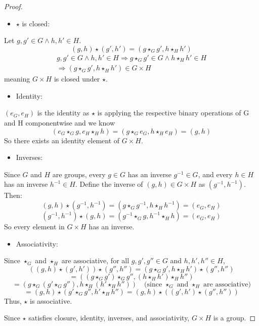 \documentclass[12pt]{article}
\begin{document}
\begin{proof}

    \noindent
    \begin{itemize}
        \item \(\star\) is closed: 
    \end{itemize}

    \noindent
    Let \(g, g' \in G \land h, h' \in H\). 
    \[ 
        (g, h) \star (g', h') = (g\star_G g', h \star_H h')
    \]
    \begin{gather*}
        g, g' \in G \land h, h' \in H 
        \Rightarrow g \star_G g' \in G \land h \star_H h' \in H  \\
        \Rightarrow (g \star_G g', h \star_H h') \in G\times H 
    \end{gather*}
    meaning \(G \times H\) is closed under \(\star\).

    \begin{itemize}
        \item Identity: 
    \end{itemize}

    \noindent
    \((e_G, e_H)\) is the identity as \(\star\) is applying the respective 
    binary operations of G and H componentwise and we know 
    \[ 
        (e_G \star_G g, e_H \star_H h) = (g \star_G e_G, h \star_H e_H) = 
        (g, h)
    \]
    So there exists an identity element of \(G \times H\).

    \begin{itemize}
        \item Inverses:
    \end{itemize}

    \noindent
    Since \(G\) and \(H\) are groups, every \(g \in G\) has an inverse \(g^{-1} \in G\), and every \(h \in H\) has an inverse \(h^{-1} \in H\).  
    Define the inverse of \((g, h) \in G \times H\) as \((g^{-1}, h^{-1})\). Then:
    \[
        (g, h) \star (g^{-1}, h^{-1}) = (g \star_G g^{-1}, h \star_H h^{-1}) = (e_G, e_H)
    \]
    \[
        (g^{-1}, h^{-1}) \star (g, h) = (g^{-1} \star_G g, h^{-1} \star_H h) = (e_G, e_H)
    \]
    So every element in \(G \times H\) has an inverse.

    \begin{itemize}
        \item Associativity:
    \end{itemize}

    \noindent
    Since \(\star_G\) and \(\star_H\) are associative, for all \(g, g', g'' \in G\) and \(h, h', h'' \in H\),
    \[
        ((g, h) \star (g', h')) \star (g'', h'') = (g \star_G g', h \star_H h') \star (g'', h'')
    \]
    \[
        = ((g \star_G g') \star_G g'', (h \star_H h') \star_H h'') 
    \]
    \[
        = (g \star_G (g' \star_G g''), h \star_H (h' \star_H h'')) \quad \text{(since \(\star_G\) and \(\star_H\) are associative)}
    \]
    \[
        = (g, h) \star (g' \star_G g'', h' \star_H h'') = (g, h) \star ((g', h') \star (g'', h''))
    \]
    Thus, \(\star\) is associative.

    \noindent
    Since \(\star\) satisfies closure, identity, inverses, and associativity, \(G \times H\) is a group.
\end{proof}
\end{document}
